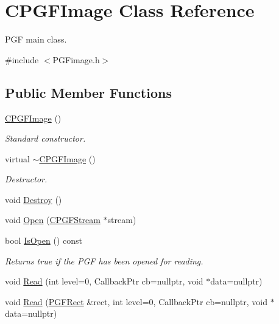 \hypertarget{classCPGFImage}{}\section{C\+P\+G\+F\+Image Class Reference}
\label{classCPGFImage}


P\+GF main class.  




{\ttfamily \#include $<$P\+G\+Fimage.\+h$>$}

\subsection*{Public Member Functions}
\begin{DoxyCompactItemize}
\item 
\mbox{\hyperlink{classCPGFImage_af98838248d4bb5e0b2e89e2cd31b4b71}{C\+P\+G\+F\+Image}} ()
\begin{DoxyCompactList}\small\item\em Standard constructor. \end{DoxyCompactList}\item 
virtual \mbox{\hyperlink{classCPGFImage_a1bdfdce118d4a7c9167154b5ff0bb670}{$\sim$\+C\+P\+G\+F\+Image}} ()
\begin{DoxyCompactList}\small\item\em Destructor. \end{DoxyCompactList}\item 
void \mbox{\hyperlink{classCPGFImage_a4a3e55e2e2d8ddf79506769feb8938ec}{Destroy}} ()
\item 
void \mbox{\hyperlink{classCPGFImage_adbe9092b915a2c5b2361f4db186b991c}{Open}} (\mbox{\hyperlink{classCPGFStream}{C\+P\+G\+F\+Stream}} $\ast$stream)
\item 
bool \mbox{\hyperlink{classCPGFImage_a73a46482fbfc549f8baa485c9b09f67a}{Is\+Open}} () const
\begin{DoxyCompactList}\small\item\em Returns true if the P\+GF has been opened for reading. \end{DoxyCompactList}\item 
void \mbox{\hyperlink{classCPGFImage_a4a1d49cdf9da6934381bb25332d85ccf}{Read}} (int level=0, Callback\+Ptr cb=nullptr, void $\ast$data=nullptr)
\item 
void \mbox{\hyperlink{classCPGFImage_ad25f535f946f5a711576d6b28774cbb9}{Read}} (\mbox{\hyperlink{structPGFRect}{P\+G\+F\+Rect}} \&rect, int level=0, Callback\+Ptr cb=nullptr, void $\ast$data=nullptr)

\end{DoxyCompactItemize}
